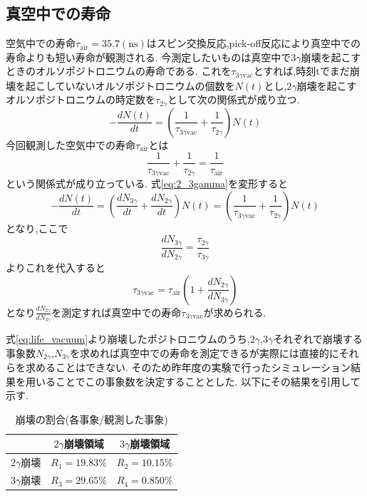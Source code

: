 \subsection{真空中での寿命}
空気中での寿命$\tau_\textrm{air}=35.7(\textrm{ns})$はスピン交換反応,pick-off反応により真空中での寿命よりも短い寿命が観測される.
今測定したいものは真空中で$3\gamma$崩壊を起こすときのオルソポジトロニウムの寿命である.
これを$\tau_{3\gamma\textrm{vac}}$とすれば,時刻tでまだ崩壊を起こしていないオルソポジトロニウムの個数を$N(t)$とし,$2\gamma$崩壊を起こすオルソポジトロニウムの時定数を$\tau_{2\gamma}$として次の関係式が成り立つ.
\begin{equation}
	-\frac{dN(t)}{dt}=\left(\frac{1}{\tau_{3\gamma\textrm{vac}}}+\frac{1}{\tau_{2\gamma}}\right)N(t)
	\label{eq:2_3gamma}
\end{equation}
今回観測した空気中での寿命$\tau_\textrm{air}$とは
\begin{equation}
	\nonumber
	\frac{1}{\tau_{3\gamma\textrm{vac}}}+\frac{1}{\tau_{2\gamma}}=\frac{1}{\tau_\textrm{air}}
\end{equation}
という関係式が成り立っている.
式\ref{eq:2_3gamma}を変形すると
\begin{equation}
	\nonumber
	-\frac{dN(t)}{dt}=\left(\frac{dN_{3\gamma}}{dt}+\frac{dN_{2\gamma}}{dt}\right)N(t)=\left(\frac{1}{\tau_{3\gamma\textrm{vac}}}+\frac{1}{\tau_{2\gamma}}\right)N(t)
\end{equation}
となり,ここで
\begin{equation}
	\nonumber
	\frac{dN_{3\gamma}}{dN_{2\gamma}}=\frac{\tau_{2\gamma}}{\tau_{3\gamma}}
\end{equation}
よりこれを代入すると
\begin{equation}
	\tau_{3\gamma\textrm{vac}}=\tau_\textrm{air}\left(1+\frac{dN_{2\gamma}}{dN_{3\gamma}}\right)
	\label{eq:life_vacuum}
\end{equation}
となり$\frac{dN_{2\gamma}}{dN_{3\gamma}}$を測定すれば真空中での寿命$\tau_{3\gamma \textrm{vac}}$が求められる.

式\ref{eq:life_vacuum}より崩壊したポジトロニウムのうち,$2\gamma$,$3\gamma$それぞれで崩壊する事象数$N_{2\gamma}$,$N_{3\gamma}$を求めれば真空中での寿命を測定できるが実際には直接的にそれらを求めることはできない.
そのため昨年度の実験で行ったシミュレーション結果を用いることでこの事象数を決定することとした.
以下にその結果を引用して示す.
\begin{table}[htbp]
	\centering
		\caption{崩壊の割合(各事象/観測した事象)}
		\begin{tabular}{|l|c|c|} \hline
			& $2\gamma$崩壊領域 & $3\gamma$崩壊領域 \\ \hline
			$2\gamma$崩壊 & $R_1=19.83\%$ & $R_2=10.15\%$\\
			$3\gamma$崩壊 & $R_3=29.65\%$ & $R_4=0.850\%$\\ \hline
		\end{tabular}
		\label{2_3gamma_ratio}
\end{table}

